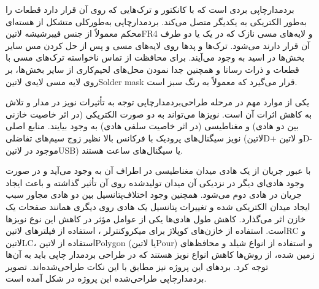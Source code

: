 بردمدارچاپی بردی است که با کانکتور و ترک‌هایی که روی آن قرار دارد قطعات را به‌طور الکتریکی به یکدیگر متصل می‌کند. بردمدارچاپی به‌طورکلی متشکل از هسته‌ای محکم معمولاً از جنس فیبرشیشه ‌لاتین{FR4} و لایه‌های مسی نازک که در یک یا دو طرف آن قرار دارند می‌شود. ترک‌ها و پدها روی لایه‌های مسی و پس از حل کردن مس سایر بخش‌ها در اسید به وجود می‌آیند. برای محافظت از تماس ناخواسته ترک‌های مسی با قطعات و ذرات رسانا و همچنین جدا نمودن محل‌های لحیم‌کاری از سایر بخش‌ها، بر روی لایه مسی لایه‌ی ‌لاتین{Solder mask} قرار می‌گیرد که معمولاً به رنگ سبز است.

یکی از موارد مهم در مرحله طراحی‌بردمدارچاپی توجه به تأثیرات نویز در مدار و تلاش به کاهش اثرات آن است. نویزها می‌تواند به دو صورت الکتریکی (در اثر خاصیت خازنی بین دو هادی) و مغناطیسی (در اثر خاصیت سلفی هادی) به وجود بیایند. منابع اصلی نویز سیگنال‌های پرودیک با فرکانس بالا نظیر زوج سیم‌های تفاضلی (‌لاتین{D+} و ‌لاتین{D-} موجود در ‌لاتین{USB}) یا سیگنال‌های ساعت هستند. 

با عبور جریان از یک هادی میدان مغناطیسی در اطراف آن به وجود می‌آید و در صورت وجود هادی‌ای دیگر در نزدیکی آن میدان تولیدشده روی آن تأثیر گذاشته و باعث ایجاد جریان در هادی دوم می‌شود. همچنین وجود اختلاف‌پتانسیل بین دو هادی مجاور سبب ایجاد میدان الکتریکی شده و تغییرات پتانسیل یک هادی روی دیگری همانند صفحات یک خازن اثر می‌گذارد. کاهش طول هادی‌ها یکی از عوامل مؤثر در کاهش این نوع نویزها است. استفاده از خازن‌های کوپلاژ برای میکروکنترلر ، استفاده از فیلترهای ‌لاتین{RC} و ‌لاتین{LC}، استفاده از ‌لاتین{Polygon} (یا ‌لاتین{Pour}) و استفاده از انواع شیلد و محافظ‌های زمین شده، از روش‌ها کاهش انواع نویز هستند که در طراحی بردمدار چاپی باید به آن‌ها توجه کرد. بردهای این پروژه نیز مطابق با این نکات طراحی‌شده‌اند. تصویر بردمدارچاپی طراحی‌شده این پروژه در شکل    آمده است.
 

